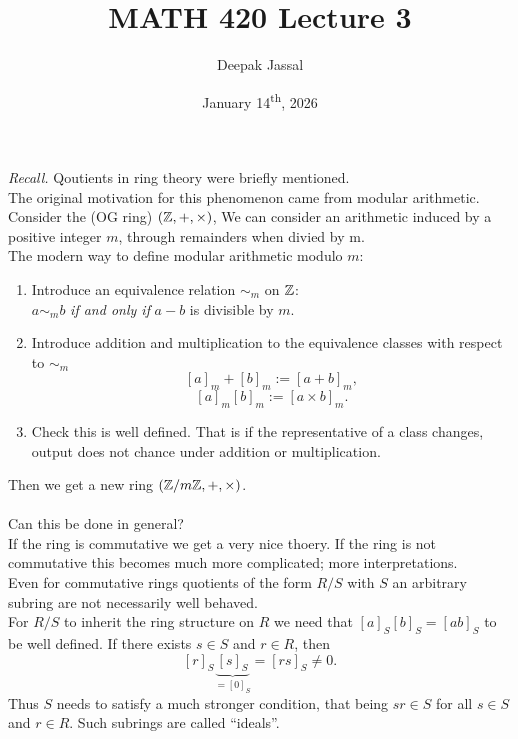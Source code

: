 \documentclass[12pt]{article}
\title{MATH 420 Lecture 3}
\author{Deepak Jassal}
\date{January 14\textsuperscript{th}, 2026}
\begin{document}
\setcounter{section}{1}
\maketitle  
\textit{Recall.} Qoutients in ring theory were briefly mentioned.\\
The original motivation for this phenomenon came from modular arithmetic.\\
Consider the (OG ring) $(\mathbb{Z},+,\times)$, We can consider an arithmetic induced by a positive integer $m$, through remainders when divied by m.\\
The modern way to define modular arithmetic modulo $m$:
\begin{enumerate}
    \item Introduce an equivalence relation $\sim_m$ on $\mathbb{Z}$:\\
    $a\sim_m b$ \textit{if and only if} $a-b$ is divisible by $m$.
    \item Introduce addition and multiplication to the equivalence classes with respect to $\sim_m$
    \[
        [a]_m+[b]_m:=[a+b]_m,
    \]
    \[
        [a]_m[b]_m:=[a\times b]_m.
    \]
    \item Check this is well defined. That is if the representative of a class changes, output does not chance under addition or multiplication.
\end{enumerate}
Then we get a new ring $(\mathbb{Z}/m\mathbb{Z},+,\times)$.\\\\
Can this be done in general?\\
If the ring is commutative we get a very nice thoery. If the ring is not commutative this becomes much more complicated; more interpretations.\\
Even for commutative rings quotients of the form $R/S$ with $S$ an arbitrary subring are not necessarily well behaved.\\
For $R/S$ to inherit the ring structure on $R$ we need that $[a]_S[b]_S=[ab]_S$ to be well defined. If there exists $s\in S$ and $r\in R$, then
\[
    [r]_S\underbrace{[s]_S}_{=[0]_S}=[rs]_S\neq0.
\]
Thus $S$ needs to satisfy a much stronger condition, that being $sr\in S$ for all $s\in S$ and $r\in R$. Such subrings are called ``ideals''.
\end{document}
